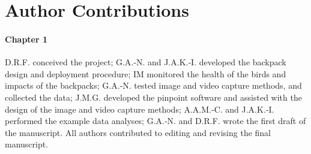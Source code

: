 \documentclass[11pt,a4paper,oneside]{article}
\begin{document}
\section{Author Contributions}
\paragraph{Chapter 1}
D.R.F. conceived the project; G.A.‐N. and J.A.K.‐I. developed the backpack design and deployment procedure; IM monitored the health of the birds and impacts of the backpacks; G.A.‐N. tested image and video capture methods, and collected the data; J.M.G. developed the pinpoint software and assisted with the design of the image and video capture methods; A.A.M.‐C. and J.A.K.‐I. performed the example data analyses; G.A.‐N. and D.R.F. wrote the first draft of the manuscript. All authors contributed to editing and revising the final manuscript.
\end{document}
